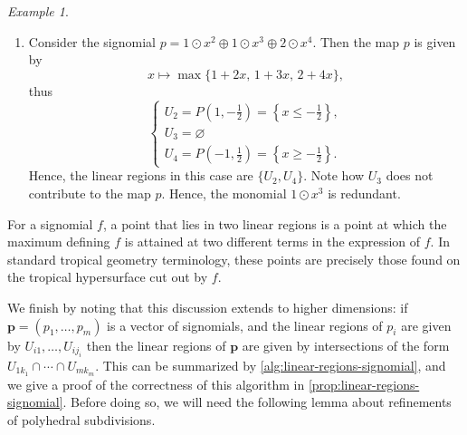 \documentclass[10pt]{article}
\newtheorem{lemma}[theorem]{Lemma}
\theoremstyle{definition}
\theoremstyle{remark}
\newtheorem{example}[theorem]{Example}
\newcommand{\RR}{{\mathbb{R}}}
\renewcommand{\vec}[1]{\mathbf{#1}}
\def\vp{{\vec{p}}}
\begin{document}
\begin{example}
\begin{enumerate}
        \item Consider the signomial $p=1\odot x^2\oplus 1\odot x^3\oplus 2\odot x^4$. Then the map $p$ is given by
        $$
        x\mapsto\max\{1+2x,\, 1+3x,\, 2+4x\},
        $$
        thus
        $$
        \begin{cases}U_2=P\left(1,-\frac{1}{2}\right)=\left\{x\leq-\frac{1}{2}\right\},\\U_3=\varnothing\\U_4=P\left(-1,\frac{1}{2}\right)=\left\{x\geq-\frac{1}{2}\right\}.\end{cases}
        $$
        Hence, the linear regions in this case are $\{U_2,U_4\}$. Note how $U_3$ does not contribute to the map $p$. Hence, the monomial $1\odot x^3$ is redundant.
    \end{enumerate}
\end{example}

For a signomial $f$, a point that lies in two linear regions is a point at which the maximum defining $f$ is attained at two different terms in the expression of $f$. In standard tropical geometry terminology, these points are precisely those found on the tropical hypersurface cut out by $f$. 

We finish by noting that this discussion extends to higher dimensions: if $\vp = (p_1, \dotsc, p_m)$ is a vector of signomials, and the linear regions of $p_i$ are given by $U_{i1}, \dotsc, U_{ij_i}$ then the linear regions of $\vp$ are given by intersections of the form $U_{1k_1} \cap \dotsb \cap U_{mk_m}$. This can be summarized by \cref{alg:linear-regions-signomial}, and we give a proof of the correctness of this algorithm in \cref{prop:linear-regions-signomial}. Before doing so, we will need the following lemma about refinements of polyhedral subdivisions.

\end{document}
